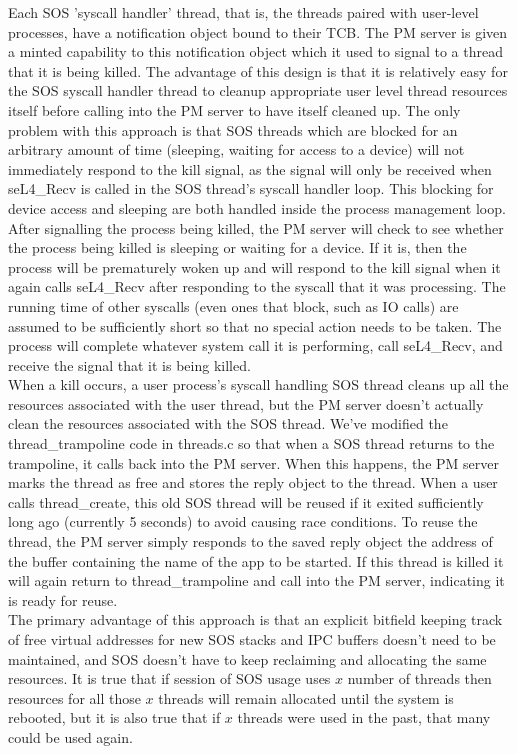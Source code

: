 \noindent
Each SOS 'syscall handler' thread, that is, the threads paired with user-level
processes, have a notification object bound to their TCB. The PM
server is given a minted capability to this notification object which it used
to signal to a thread that it is being killed. The advantage of this design is
that it is relatively easy for the SOS syscall handler thread to cleanup
appropriate user level thread resources itself before calling into
the PM server to have itself cleaned up. The only problem
with this approach is that SOS threads which are blocked for an arbitrary amount
of time (sleeping, waiting for access to a device) will not immediately respond to
the kill signal, as the signal will only be received when seL4\_Recv is called
in the SOS thread's syscall handler loop. This blocking for device access and 
sleeping are both handled inside the process management loop. After signalling
the process being killed, the PM server will check to see whether the process
being killed is sleeping or waiting for a device. If it is, then the process
will be prematurely woken up and will respond to the kill signal when it 
again calls seL4\_Recv after responding to the syscall that it was processing.
The running time of other syscalls (even ones that block, such as IO calls) are 
assumed to be sufficiently short so that no special action needs to be taken. The
process will complete whatever system call it is performing, call seL4\_Recv,
and receive the signal that it is being killed.
\\

\noindent
When a kill occurs, a user process's syscall handling SOS thread cleans up
all the resources associated with the user thread, but the PM server doesn't
actually clean the resources associated with the SOS thread. We've modified 
the thread\_trampoline code in threads.c so that when a SOS thread returns to the
trampoline, it calls back into the PM server. When this happens, the PM server 
marks the thread as free and stores the reply object to the thread. When a 
user calls thread\_create, this old SOS thread will be reused if it exited 
sufficiently long ago (currently 5 seconds) to avoid causing race conditions.
To reuse the thread, the PM server simply responds to the saved reply object the
address of the buffer containing the name of the app to be started. If this thread
is killed it will again return to thread\_trampoline and call into the PM server,
indicating it is ready for reuse.
\\

\noindent
The primary advantage of this approach is that an explicit bitfield keeping track
of free virtual addresses for new SOS stacks and IPC buffers doesn't need to be 
maintained, and SOS doesn't have to keep reclaiming and allocating the same
resources. It is true that if session of SOS usage uses $x$ number of threads then
resources for all those $x$ threads will remain allocated until the system is
rebooted, but it is also true that if $x$ threads were used in the past, that many
could be used again.
\\
